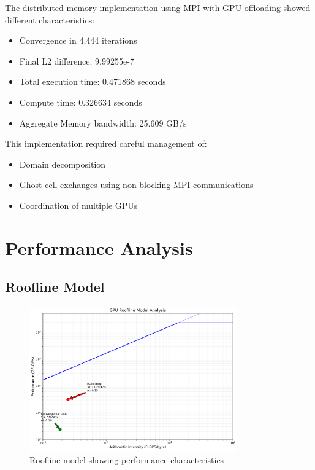 \documentclass{article}
\begin{document}
The distributed memory implementation using MPI with GPU offloading showed different characteristics:

\begin{itemize}
    \item Convergence in 4,444 iterations
    \item Final L2 difference: 9.99255e-7
    \item Total execution time: 0.471868 seconds
    \item Compute time: 0.326634 seconds
    \item Aggregate Memory bandwidth: 25.609 GB/s
\end{itemize}

This implementation required careful management of:
\begin{itemize}
    \item Domain decomposition
    \item Ghost cell exchanges using non-blocking MPI communications
    \item Coordination of multiple GPUs
\end{itemize}

\section{Performance Analysis}

\subsection{Roofline Model}

\begin{figure}[H]
    \centering
    \includegraphics[width=0.8\textwidth]{gpu_roofline_model.png}
    \caption{Roofline model showing performance characteristics}
    \label{fig:roofline}
\end{figure}
\end{document}

